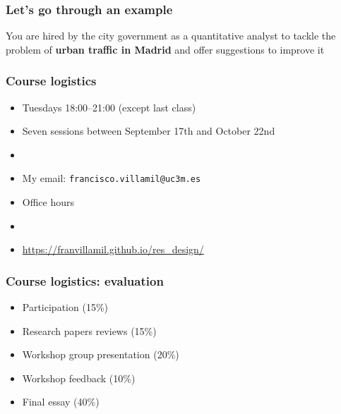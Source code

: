 \documentclass[aspectratio=43]{beamer}
\begin{document}
\begin{frame}
\frametitle{Let's go through an example}
\centering

You are hired by the city government as a quantitative analyst to tackle the problem of \textbf{urban traffic in Madrid} and offer suggestions to improve it

\end{frame}

\begin{frame}
\frametitle{Course logistics}
\centering

\begin{itemize}
  \item Tuesdays 18:00--21:00 (except last class)
  \item Seven sessions between September 17th and October 22nd
  \item[]
  \item My email: \texttt{francisco.villamil@uc3m.es}
  \item Office hours
  \item[]
  \item \url{https://franvillamil.github.io/res_design/}
\end{itemize}

\end{frame}

\begin{frame}
\frametitle{Course logistics: evaluation}
\centering

\begin{itemize}
  \item Participation (15\%)
  \item Research papers reviews (15\%)
  \item Workshop group presentation (20\%)
  \item Workshop feedback (10\%)
  \item Final essay (40\%)
\end{itemize}

\end{frame}
\end{document}
